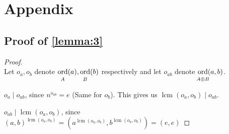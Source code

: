\documentclass{article}
\newcommand{\ordgroup}[1]{\ord_{\rule{0pt}{8pt}\mathclap{#1}}}
\DeclareMathOperator{\ordb}{ord}
\newcommand{\ord}{\mathop{\ordb}\limits}
\DeclareMathOperator{\lcm}{lcm}
\newenvironment{pg}{

}{\medskip}
\begin{document}
	\section{Appendix}\label{sec:appendix}
	
	\subsection{\texorpdfstring{Proof of \cref{lemma:3}}{Proof of Lemma 3}}\label{sec:proveLemmaThree}
	
	\usebox{\proveLemmaThree}
	
	\begin{proof} \rule{0pt}{0pt}\\
		Let $o_a, o_b$ denote $\ordgroup{A}(a), \ordgroup{B}(b)$ respectively and let $o_{ab}$ denote $\ordgroup{A \oplus B}(a,b)$.
		\begin{pg}
			$o_a \mid o_{ab}$, since $n^{o_{ab}} = e$ (Same for $o_b$). This gives us $\lcm(o_a, o_b) \mid o_{ab}$.
		\end{pg}
		\begin{pg}
			$o_{ab} \mid \lcm(o_a, o_b)$, since $(a,b)^{\lcm(o_a, o_b)} = (a^{\lcm(o_a, o_b)}, b^{\lcm(o_a, o_b)}) = (e,e)$
		\end{pg}
	\end{proof}
	
	\printbibliography
\end{document}
